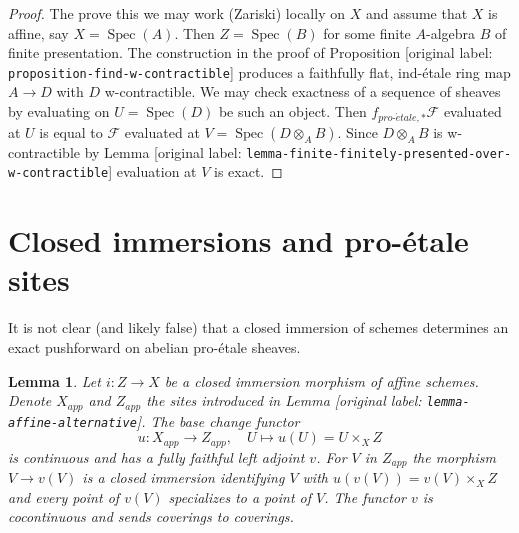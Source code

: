 \documentclass[10pt,a4paper]{article}
\theoremstyle{plain}
\newtheorem{lemma}[subsection]{Lemma}
\theoremstyle{definition}
\theoremstyle{remark}
\numberwithin{equation}{subsection}
\def\Spec{\mathop{\mathrm{Spec}}}
\def\proetale{{pro\text{-}\acute{e}tale}}
\begin{document}
\begin{proof}
The prove this we may work (Zariski) locally on $X$ and assume that $X$
is affine, say $X = \Spec(A)$. Then $Z = \Spec(B)$ for some finite
$A$-algebra $B$ of finite presentation. The construction in the proof of
Proposition [original label: \nolinkurl{proposition-find-w-contractible}]
produces a faithfully flat, ind-\'etale ring map $A \to D$
with $D$ w-contractible. We may check exactness of a sequence of
sheaves by evaluating on $U = \Spec(D)$ be such an object. Then
$f_{\proetale, *}\mathcal{F}$
evaluated at $U$ is equal to $\mathcal{F}$ evaluated at
$V = \Spec(D \otimes_A B)$. Since $D \otimes_A B$ is w-contractible
by Lemma [original label: \nolinkurl{lemma-finite-finitely-presented-over-w-contractible}]
evaluation at $V$ is exact.
\end{proof}








\section{Closed immersions and pro-\'etale sites}
\label{section-closed-immersion}

\noindent
It is not clear (and likely false) that a closed immersion of schemes
determines an exact pushforward on abelian pro-\'etale sheaves.

\begin{lemma}
\label{lemma-closed-immersion-affines}
Let $i : Z \to X$ be a closed immersion morphism of affine schemes.
Denote $X_{app}$ and $Z_{app}$ the sites introduced in
Lemma [original label: \nolinkurl{lemma-affine-alternative}].
The base change functor
$$
u : X_{app} \to Z_{app},\quad U \longmapsto u(U) = U \times_X Z
$$
is continuous and has a fully faithful left adjoint $v$.
For $V$ in $Z_{app}$ the morphism $V \to v(V)$ is a closed immersion
identifying $V$ with $u(v(V)) = v(V) \times_X Z$ and every point of
$v(V)$ specializes to a point of $V$.
The functor $v$ is cocontinuous and sends coverings to coverings.
\end{lemma}
\end{document}
